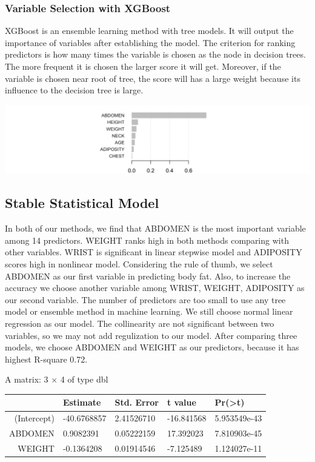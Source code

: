 \documentclass[11pt]{article}
\makeatletter
\def\maxwidth{\ifdim\Gin@nat@width>\linewidth\linewidth
    \else\Gin@nat@width\fi}
\let\Oldincludegraphics\includegraphics
\renewcommand{\includegraphics}[1]{\Oldincludegraphics[width=.8\maxwidth]{#1}}
\makeatother
\begin{document}
    \hypertarget{variable-selection-with-xgboost}{%
\subsubsection{Variable Selection with
XGBoost}\label{variable-selection-with-xgboost}}

XGBoost is an ensemble learning method with tree models. It will output
the importance of variables after establishing the model. The criterion
for ranking predictors is how many times the variable is chosen as the
node in decision trees. The more frequent it is chosen the larger score
it will get. Moreover, if the variable is chosen near root of tree, the
score will has a large weight because its influence to the decision tree
is large.

    \includegraphics{plots/xgboost.png}

    \hypertarget{stable-statistical-model}{%
\subsection{Stable Statistical Model}\label{stable-statistical-model}}

In both of our methods, we find that ABDOMEN is the most important
variable among 14 predictors. WEIGHT ranks high in both methods
comparing with other variables. WRIST is significant in linear stepwise
model and ADIPOSITY scores high in nonlinear model. Considering the rule
of thumb, we select ABDOMEN as our first variable in predicting body
fat. Also, to increase the accuracy we choose another variable among
WRIST, WEIGHT, ADIPOSITY as our second variable. The number of
predictors are too small to use any tree model or ensemble method in
machine learning. We still choose normal linear regression as our model.
The collinearity are not significant between two variables, so we may
not add regulization to our model. After comparing three models, we
choose ABDOMEN and WEIGHT as our predictors, because it has highest
R-square 0.72.

    A matrix: 3 × 4 of type dbl
\begin{tabular}{r|llll}
  & Estimate & Std. Error & t value & Pr(>\textbar{}t\textbar{})\\
\hline
	(Intercept) & -40.6768857 & 2.41526710 & -16.841568 & 5.953549e-43\\
	ABDOMEN &   0.9082391 & 0.05222159 &  17.392023 & 7.810903e-45\\
	WEIGHT &  -0.1364208 & 0.01914546 &  -7.125489 & 1.124027e-11\\
\end{tabular}
\end{document}

